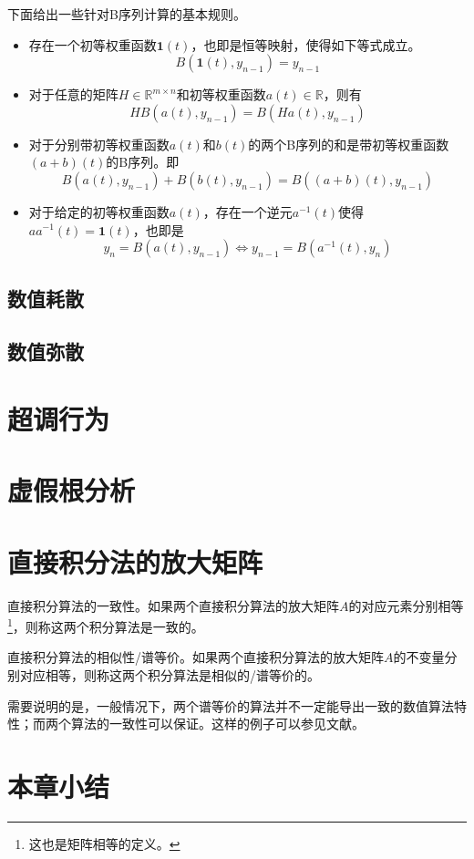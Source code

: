 下面给出一些针对B序列计算的基本规则。
\begin{itemize}
\item 存在一个初等权重函数$\bm{1}(t)$，也即是恒等映射，使得如下等式成立。
\begin{equation}
B(\bm{1}(t),y_{n-1})=y_{n-1}
\end{equation}
\item 对于任意的矩阵$H\in\mathbb{R}^{m\times n}$和初等权重函数$a(t)\in\mathbb{R}$，则有
\begin{equation}
HB(a(t),y_{n-1})=B(Ha(t),y_{n-1})
\end{equation}
\item 对于分别带初等权重函数$a(t)$和$b(t)$的两个B序列的和是带初等权重函数$(a+b)(t)$的B序列。即
\begin{equation}
B(a(t),y_{n-1})+B(b(t),y_{n-1})=B((a+b)(t),y_{n-1})
\end{equation}
\item 对于给定的初等权重函数$a(t)$，存在一个逆元$a^{-1}(t)$使得$aa^{-1}(t)=\bm{1}(t)$，也即是
\begin{equation}
y_n=B(a(t),y_{n-1})\Longleftrightarrow y_{n-1}=B(a^{-1}(t),y_n)
\end{equation}
\end{itemize}





\subsection{数值耗散}

\subsection{数值弥散}

\section{超调行为}

\section{虚假根分析}

\section{直接积分法的放大矩阵}

\begin{definition}
直接积分算法的一致性\cite{Hoff1988c}。如果两个直接积分算法的放大矩阵$A$的对应元素分别相等\footnote{这也是矩阵相等的定义。}，则称这两个积分算法是一致的。
\end{definition}

\begin{definition}
直接积分算法的相似性/谱等价\cite{Hoff1988c}。如果两个直接积分算法的放大矩阵$A$的不变量分别对应相等，则称这两个积分算法是相似的/谱等价的。
\end{definition}

需要说明的是，一般情况下，两个谱等价的算法并不一定能导出一致的数值算法特性；而两个算法的一致性可以保证。这样的例子可以参见文献。

\section{本章小结}


